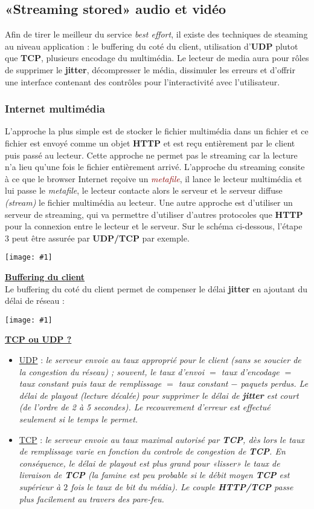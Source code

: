 \documentclass{article}
\newcommand{\ora}[1]{\textcolor{darko}{#1}}
\newcommand{\red}[1]{\textcolor{darkred}{#1}}
\newcommand{\imgR}[2]{\begin{center}\texttt{[image: \#1]}\end{center}}
\newcommand{\point}[2]{\item \ora{\underline{#1}} : \textit{#2}}
\newcommand{\stitre}[1]{\noindent\textbf{\underline{#1}} \\}
\begin{document}
\subsection{«Streaming stored» audio et vidéo}

Afin de tirer le meilleur du service \textit{best effort}, il existe des techniques de steaming au niveau 
application : le buffering du coté du client, utilisation d'\textbf{UDP} plutot que \textbf{TCP}, plusieurs 
encodage du multimédia. Le lecteur de media aura pour rôles de supprimer le \textbf{jitter}, décompresser le 
média, dissimuler les erreurs et d'offrir une interface contenant des contrôles pour l'interactivité avec 
l'utilisateur.

\subsubsection{Internet multimédia}

L'approche la plus simple est de stocker le fichier multimédia dans un fichier et ce fichier est envoyé comme un 
objet \textbf{HTTP} et est reçu entièrement par le client puis passé au lecteur. Cette approche ne permet pas le 
streaming car la lecture n'a lieu qu'une fois le fichier entièrement arrivé. L'approche du streaming consite à ce 
que le browser Internet reçoive un \textit{\red{metafile}}, il lance le lecteur multimédia et lui passe le
\textit{metafile}, le lecteur contacte alors le serveur et le serveur diffuse \textit{(stream)} le fichier 
multimédia au lecteur. Une autre approche est d'utiliser un serveur de streaming, qui va permettre d'utiliser 
d'autres protocoles que \textbf{HTTP} pour la connexion entre le lecteur et le serveur. Sur le schéma ci-dessous,
l'étape $3$ peut être assurée par \textbf{UDP/TCP} par exemple.

\imgR{CN_173.png}{300}

\stitre{Buffering du client}

Le buffering du coté du client permet de compenser le délai \textbf{jitter} en ajoutant du délai de réseau :

\imgR{CN_174.png}{300}

\stitre{TCP ou UDP ?}

\begin{itemize}
\point{UDP}{le serveur envoie au taux approprié pour le client (sans se soucier de la congestion du réseau) ; 
souvent, le taux d'envoi $=$ taux d'encodage $=$ taux constant puis taux de remplissage $=$ taux constant $-$ 
paquets perdus. Le délai de playout (lecture décalée) pour supprimer le délai de \textbf{jitter} est court 
(de l'ordre de 2 à 5 secondes). Le recouvrement d'erreur est effectué seulement si le temps le permet.}
\point{TCP}{le serveur envoie au taux maximal autorisé par \textbf{TCP}, dès lors le taux de remplissage varie en 
fonction du controle de congestion de \textbf{TCP}. En conséquence, le délai de playout est plus grand pour 
«lisser» le taux de livraison de \textbf{TCP} (la famine est peu probable si le débit moyen 
\textbf{TCP} est supérieur à $2$ fois le taux de bit du média). Le couple \textbf{HTTP/TCP} passe plus 
facilement au travers des pare-feu.} \\
\end{itemize}
\end{document}
